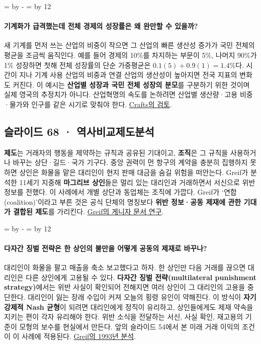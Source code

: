 \documentclass[10pt,a4paper]{article}
\newcommand{\ReserveQuestionSpace}{%
  \par\begingroup
  \dimen0=\pagegoal \advance\dimen0 by -\pagetotal
  \dimen2=\baselineskip \multiply\dimen2 by 12
  \ifdim\dimen0<\dimen2 \newpage\fi
  \endgroup}
\begin{document}
\ReserveQuestionSpace
\paragraph{기계화가 급격했는데 전체 경제의 성장률은 왜 완만할 수 있을까?}

새 기계를 먼저 쓰는 산업의 비중이 작으면 그 산업의 빠른 생산성 증가가 국민 전체의 평균을 조금씩 움직인다. 예를 들어 경제의 10\%를 차지하는 부문이 5\%, 나머지 90\%가 1\% 성장하면 첫해 전체 성장률의 단순 가중평균은 $0.1(5)+0.9(1)=1.4\%$다. 시간이 지나 기계 사용 산업의 비중과 연결 산업의 생산성이 높아지면 전국 지표의 변화도 커진다. 이 예시는 \textbf{산업별 성장과 국민 전체 성장의 분모}를 구분하기 위한 것이며 실제 영국의 추정치가 아니다. 산업혁명의 속도를 논하려면 산업별 생산량·고용 비중·물가와 인구를 같은 시기로 맞춰야 한다. \href{https://www.bancaditalia.it/pubblicazioni/altri-atti-seminari/2005/CRAFTS\_22\_03\_2005.pdf}{Crafts의 검토}.\par

\subsection{슬라이드 68 · 역사비교제도분석}
\textbf{제도}는 거래자의 행동을 제약하는 규칙과 공유된 기대이고, \textbf{조직}은 그 규칙을 사용하거나 바꾸는 상단·길드·국가 기구다. 중앙 권력이 먼 항구의 계약을 충분히 집행하지 못하면 상인은 화물을 맡은 대리인이 현지 판매 대금을 숨길 위험을 떠안는다. Greif가 분석한 11세기 지중해 \textbf{마그리브 상인}들은 멀리 있는 대리인과 거래하면서 서신으로 위반 정보를 전했다. 이 사례에서 개별 상단과 동업체는 조직에 가깝다. Greif가 ‘연합(coalition)’이라고 부른 것은 공식 단체의 명칭보다 \textbf{위반 정보·공동 제재에 관한 기대가 결합된 제도}를 가리킨다. \href{https://web.stanford.edu/\%7Eavner/Greif\_Papers/1989\%20Greif\%20JEH\%201989.pdf}{Greif의 게니자 문서 연구}.\par

\ReserveQuestionSpace
\paragraph{다자간 징벌 전략은 한 상인의 불만을 어떻게 공동의 제재로 바꾸나?}

대리인이 화물을 팔고 매출을 축소 보고했다고 하자. 한 상인만 다음 거래를 끊으면 대리인은 다른 상인에게 고용될 수 있다. \textbf{다자간 징벌 전략(multilateral punishment strategy)}에서는 위반 사실이 확인되어 전해지면 여러 상인이 그 대리인의 고용을 중단한다. 대리인이 잃는 장래 수입이 커져 오늘의 횡령 유인이 약해진다. 이 방식이 \textbf{자기강제적 Nash 균형}이 되려면 대리인에게 정직이 유리하고, 상인들에게도 제재 약속을 지키는 편이 각자 유리해야 한다. 위반 소식을 전달하는 서신, 사실 확인, 재고용의 기준이 모형의 보수를 현실에서 만든다. 앞의 슬라이드 54에서 본 미래 거래 이익의 조건이 이 사례에 적용된다. \href{https://web.stanford.edu/\%7Eavner/Greif\_Papers/1993\%20Greif\%20AER\%201993.pdf}{Greif의 1993년 분석}.\par
\end{document}

